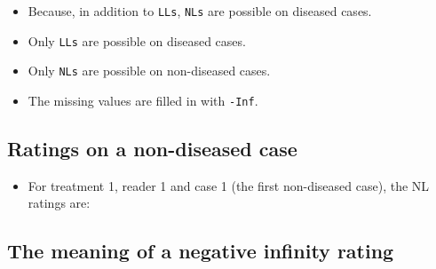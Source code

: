 \documentclass[]{book}
\newenvironment{Shaded}{\begin{snugshade}}{\end{snugshade}}
\newcommand{\CommentTok}[1]{\textcolor[rgb]{0.56,0.35,0.01}{\textit{#1}}}
\newcommand{\DecValTok}[1]{\textcolor[rgb]{0.00,0.00,0.81}{#1}}
\newcommand{\NormalTok}[1]{#1}
\newcommand{\OperatorTok}[1]{\textcolor[rgb]{0.81,0.36,0.00}{\textbf{#1}}}
\providecommand{\tightlist}{%
  \setlength{\itemsep}{0pt}\setlength{\parskip}{0pt}}
\begin{document}
\begin{itemize}
\tightlist
\item
  Because, in addition to \texttt{LLs}, \texttt{NLs} are possible on diseased cases.
\item
  Only \texttt{LLs} are possible on diseased cases.
\item
  Only \texttt{NLs} are possible on non-diseased cases.
\item
  The missing values are filled in with \texttt{-Inf}.
\end{itemize}

\hypertarget{ratings-on-a-non-diseased-case}{%
\subsection{Ratings on a non-diseased case}\label{ratings-on-a-non-diseased-case}}

\begin{itemize}
\tightlist
\item
  For treatment 1, reader 1 and case 1 (the first non-diseased case), the NL ratings are:
\end{itemize}

\begin{Shaded}
\end{Shaded}

\hypertarget{the-meaning-of-a-negative-infinity-rating}{%
\subsection{The meaning of a negative infinity rating}\label{the-meaning-of-a-negative-infinity-rating}}
\end{document}
